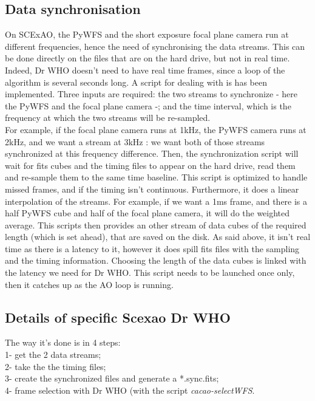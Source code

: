 \documentclass[twocolumn]{aastex62}
\begin{document}
\subsection{Data synchronisation}

On SCExAO, the PyWFS and the short exposure focal plane camera run at different frequencies, hence the need of synchronising the data streams. 
This can be done directly on the files that are on the hard drive, but not in real time. Indeed, Dr WHO doesn't need to have real time frames, since a loop of the algorithm is several seconds long. 
A script for dealing with is has been implemented. Three inputs are required: the two streams to synchronize - here the PyWFS and the focal plane camera -; and the time interval, which is the frequency at which the two streams will be re-sampled. \\
For example, if the focal plane camera runs at 1kHz, the PyWFS camera runs at 2kHz, and we want a stream at 3kHz : we want both of those streams synchronized at this frequency difference. Then, the synchronization script will wait for fits cubes and the timing files to appear on the hard drive, read them and re-sample them to the same time baseline. This script is optimized to handle missed frames, and if the timing isn't continuous. Furthermore, it does a linear interpolation of the streams. For example, if we want a 1ms frame, and there is a half PyWFS cube and half of the focal plane camera, it will do the weighted average. 
This scripts then provides an other stream of data cubes of the required length (which is set ahead), that are saved on the disk. As said above, it isn't real time as there is a latency to it, however it does spill fits files with the sampling and the timing information. Choosing the length of the data cubes is linked with the latency we need for Dr WHO. This script needs to be launched once only, then it catches up as the AO loop is running. 

\subsection{Details of specific Scexao Dr WHO }

The way it's done is in 4 steps: \\
1- get the 2 data streams; \\
2- take the the timing files; \\ 
3- create the synchronized files and generate a *.sync.fits;\\ 
4- frame selection with Dr WHO (with the script \textit{cacao-selectWFS}. \\
\end{document}
